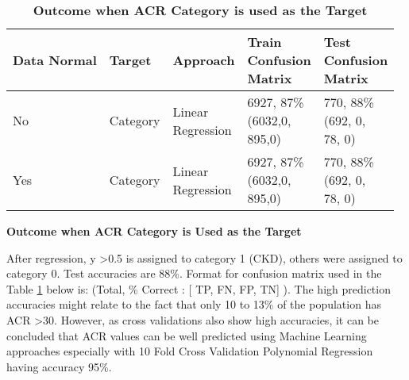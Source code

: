 \begin{table}
\caption{\textbf{Outcome when ACR Category is used as the Target}}
\label{outcome-acr-category}
\vspace{0.25cm}
\small
\begin{tabular}{ |p{1.1cm} | p{1.15cm} | p{1.5cm} | p{1.4cm} | p{1.4cm} | }
\hline
\textbf{Data Normal}	& \textbf{Target} & \textbf{Approach}	& \specialcell{\textbf{Train} \\ Confusion \\ \textbf{Matrix} }	   & \specialcell{\textbf{Test} \\ Confusion \\ \textbf{Matrix} } \\
\hline
No		& Category	&  \specialcell{ Linear  \\Regression}	 &  \specialcell {6927, 87\%  \\ (6032,0, \\ 895,0)}  &	\specialcell{ 770, 88\% \\  (692, 0,  \\78, 0) }   \\
\hline
Yes		& Category	&  \specialcell{Linear \\ Regression}	&  \specialcell{6927, 87\%  \\  (6032,0, \\ 895,0)}  &	\specialcell{ 770, 88\% \\ (692, 0, \\78, 0) }   \\
\hline
\end{tabular}
\end{table}

\medskip
\noindent \textbf{Outcome when ACR Category is Used as the Target}

\noindent After regression, y \textgreater 0.5 is assigned to category 1 (CKD), others were assigned to category 0. Test accuracies are 88\%. Format for confusion matrix used in the Table \ref{outcome-acr-category} below is: (Total, \% Correct : [ TP, FN, FP, TN] ). The high prediction accuracies might relate to the fact that only 10 to 13\% of the population has ACR \textgreater 30. However, as cross validations also show high accuracies, it can be concluded that ACR values can be well predicted using Machine Learning approaches especially with 10 Fold Cross Validation Polynomial Regression having accuracy 95\%.